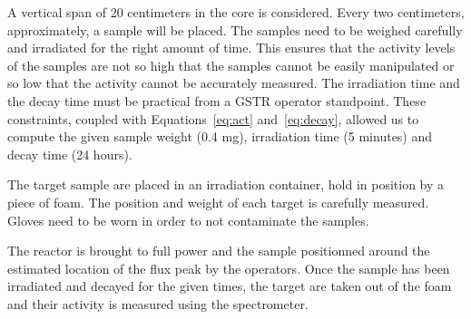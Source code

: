 A vertical span of 20 centimeters in the core is considered. Every two centimeters, approximately, a sample will be placed. The samples need to be weighed carefully and irradiated for the right amount of time. This ensures that the activity levels of the samples are not so high that the samples cannot be easily manipulated or so low that the activity cannot be accurately measured. The irradiation time and the decay time must be practical from a GSTR operator standpoint. These constraints, coupled with Equations~\ref{eq:act} and~\ref{eq:decay}, allowed us to compute the given sample weight (0.4 mg), irradiation time (5 minutes) and decay time (24 hours).

The target sample are placed in an irradiation container, hold in position by a piece of foam. The position and weight of each target is carefully measured. Gloves need to be worn in order to not contaminate the samples.

The reactor is brought to full power and the sample positionned around the estimated location of the flux peak by the operators. Once the sample has been irradiated and decayed for the given times, the target are taken out of the foam and their activity is measured using the spectrometer.

